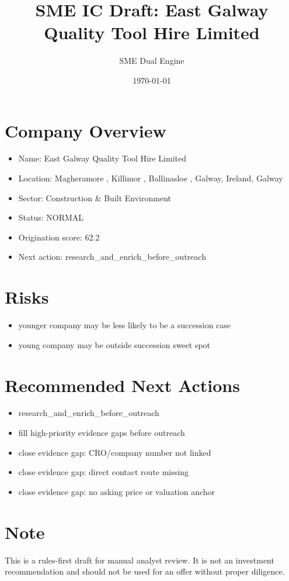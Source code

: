 \documentclass[11pt,a4paper]{article}
\title{SME IC Draft: East Galway Quality Tool Hire Limited}
\author{SME Dual Engine}
\date{\today}
\begin{document}
\maketitle
\section*{Company Overview}
\begin{itemize}[leftmargin=1.4em]
\item Name: East Galway Quality Tool Hire Limited
\item Location: Magheramore , Killimor , Ballinasloe , Galway, Ireland, Galway
\item Sector: Construction \& Built Environment
\item Status: NORMAL
\item Origination score: 62.2
\item Next action: research\_and\_enrich\_before\_outreach
\end{itemize}
\section*{Risks}
\begin{itemize}[leftmargin=1.4em]
\item younger company may be less likely to be a succession case
\item young company may be outside succession sweet spot
\end{itemize}
\section*{Recommended Next Actions}
\begin{itemize}[leftmargin=1.4em]
\item research\_and\_enrich\_before\_outreach
\item fill high-priority evidence gaps before outreach
\item close evidence gap: CRO/company number not linked
\item close evidence gap: direct contact route missing
\item close evidence gap: no asking price or valuation anchor
\end{itemize}
\section*{Note}
This is a rules-first draft for manual analyst review. It is not an investment
recommendation and should not be used for an offer without proper diligence.
\end{document}
